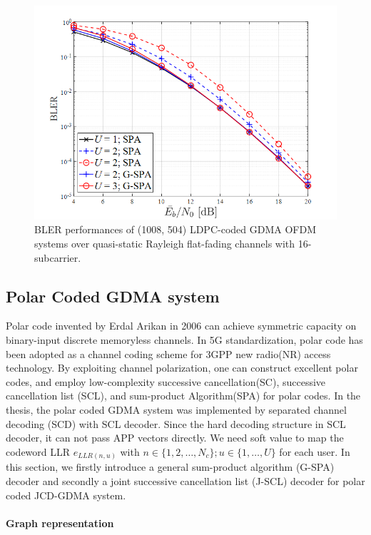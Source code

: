\begin{figure}[b!]
 \centering
 \includegraphics[width=14cm]{fig/bler_gdma_ofdm_ldpc.png}
 \caption{BLER performances of (1008, 504) LDPC-coded GDMA OFDM systems over quasi-static Rayleigh flat-fading channels with 16-subcarrier.}
 \label{fig:bler_ofdm_ldpc}
\end{figure}

\subsection{Polar Coded GDMA system}

	Polar code \cite{polar09} invented by Erdal Arikan in 2006 can achieve symmetric capacity on binary-input discrete memoryless channels. In 5G standardization, polar code has been adopted as a channel coding scheme for 3GPP new radio(NR) access technology. By exploiting channel polarization, one can construct excellent polar codes, and employ low-complexity successive cancellation(SC), successive cancellation list (SCL)\cite{scl15}, and sum-product Algorithm(SPA)\cite{arikan2010polar} for polar codes. In the thesis\cite{yt19}, the polar coded GDMA system was implemented by separated channel decoding (SCD) with SCL decoder. Since the hard decoding structure in SCL decoder, it can not pass APP vectors directly. We need soft value  to map the codeword LLR $e_{LLR(n,u)}$ with $n\in\{1,2,…,N_c \};u\in\{1,…,U\}$ for each user. In this section, we firstly introduce a general sum-product algorithm (G-SPA) decoder and secondly a joint successive cancellation list (J-SCL) decoder for polar coded JCD-GDMA system.  
	
\paragraph{Graph representation}

